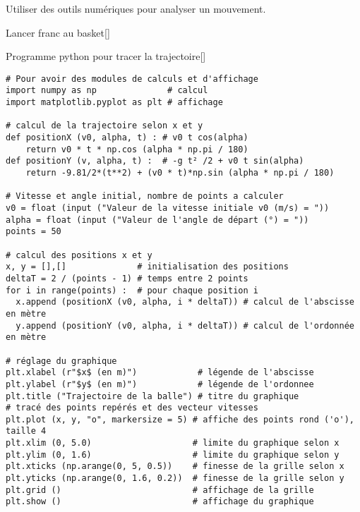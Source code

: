 \teteSndMouv

\nomPrenomClasse
{}

\begin{objectifs}
  \item Utiliser des outils numériques pour analyser un mouvement.
\end{objectifs}

\begin{doc}{Lancer franc au basket}[\label{doc:lancer_franc}]
  \begin{center}
  \end{center}
\end{doc}


\begin{doc}{Programme python pour tracer la trajectoire}[\label{doc:code_python}]
  \vspace*{-8pt}
  \lstset{style=codePython, language=python}
\begin{lstlisting}
# Pour avoir des modules de calculs et d'affichage
import numpy as np              # calcul
import matplotlib.pyplot as plt # affichage

# calcul de la trajectoire selon x et y
def positionX (v0, alpha, t) : # v0 t cos(alpha)
    return v0 * t * np.cos (alpha * np.pi / 180) 
def positionY (v, alpha, t) :  # -g t² /2 + v0 t sin(alpha)
    return -9.81/2*(t**2) + (v0 * t)*np.sin (alpha * np.pi / 180) 

# Vitesse et angle initial, nombre de points a calculer
v0 = float (input ("Valeur de la vitesse initiale v0 (m/s) = "))
alpha = float (input ("Valeur de l'angle de départ (°) = "))
points = 50

# calcul des positions x et y
x, y = [],[]              # initialisation des positions
deltaT = 2 / (points - 1) # temps entre 2 points
for i in range(points) :  # pour chaque position i
  x.append (positionX (v0, alpha, i * deltaT)) # calcul de l'abscisse en mètre
  y.append (positionY (v0, alpha, i * deltaT)) # calcul de l'ordonnée en mètre
  
# réglage du graphique
plt.xlabel (r"$x$ (en m)")            # légende de l'abscisse
plt.ylabel (r"$y$ (en m)")            # légende de l'ordonnee
plt.title ("Trajectoire de la balle") # titre du graphique
# tracé des points repérés et des vecteur vitesses
plt.plot (x, y, "o", markersize = 5) # affiche des points rond ('o'), taille 4
plt.xlim (0, 5.0)                    # limite du graphique selon x
plt.ylim (0, 1.6)                    # limite du graphique selon y
plt.xticks (np.arange(0, 5, 0.5))    # finesse de la grille selon x
plt.yticks (np.arange(0, 1.6, 0.2))  # finesse de la grille selon y
plt.grid ()                          # affichage de la grille
plt.show ()                          # affichage du graphique
\end{lstlisting}
  \vspace*{-8pt}
\end{doc}

